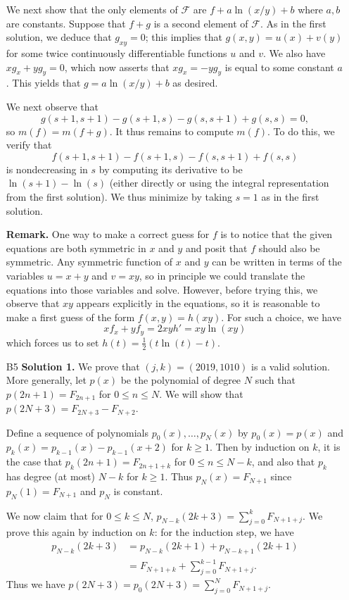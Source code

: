\documentclass[amssymb,twocolumn,pra,10pt,aps]{revtex4-1}
\begin{document}
\begin{itemize}
We next show that the only elements of $\mathcal{F}$ are $f+a \ln(x/y) + b$ where $a,b$ are constants.
Suppose that $f+g$ is a second element of $\mathcal{F}$. As in the first solution, we deduce that $g_{xy} = 0$; this implies that
$g(x,y) = u(x) + v(y)$ for some twice continuously differentiable functions $u$ and $v$. We also have
$xg_x + yg_y = 0$, which now asserts that $xg_x = - yg_y$ is equal to some constant $a$. This yields that
$g = a \ln(x/y) + b$ as desired.

We next observe that 
\[
g(s+1,s+1)-g(s+1,s)-g(s,s+1)+g(s,s) = 0,
\]
so $m(f) = m(f+g)$. It thus remains to compute $m(f)$. To do this, we verify that
\[
f(s+1,s+1)-f(s+1,s)-f(s,s+1)+f(s,s)
\]
is nondecreasing in $s$ by computing its derivative to be $\ln (s+1) - \ln(s)$
(either directly or using the integral representation from the first solution).
We thus minimize by taking $s=1$ as in the first solution.

\noindent
\textbf{Remark.}
One way to make a correct guess for $f$ is to notice that the given equations are both symmetric in $x$ and $y$
and posit that $f$ should also be symmetric. Any symmetric function of $x$ and $y$ can be written in terms of the variables $u = x+y$ and $v = xy$, so in principle we could translate the equations into those variables and solve. However, before trying this, we observe that $xy$ appears explicitly in the equations, so it is reasonable to make a first guess of the form $f(x,y) = h(xy)$. 
For such a choice, we have
\[
x f_x + y f_y = 2xy h' = xy \ln(xy)
\]
which forces us to set $h(t)  = \frac{1}{2}(t \ln(t) - t)$.

\item[B5]
\noindent
\textbf{Solution 1.}
We prove that $(j,k) = (2019, 1010)$ is a valid solution.
More generally, let $p(x)$ be the polynomial of degree $N$ such that $p(2n+1) = F_{2n+1}$ for $0 \leq n \leq N$. We will show that $p(2N+3) = F_{2N+3}-F_{N+2}$. 

Define a sequence of polynomials $p_0(x),\ldots,p_N(x)$ by $p_0(x) = p(x)$ and $p_k(x) = p_{k-1}(x)-p_{k-1}(x+2)$ for $k \geq 1$. Then by induction on $k$, it is the case that $p_k(2n+1) = F_{2n+1+k}$ for $0 \leq n \leq N-k$, and also that $p_k$ has degree (at most) $N-k$ for $k \geq 1$. Thus $p_N(x) = F_{N+1}$ since $p_N(1) = F_{N+1}$ and $p_N$ is constant.


We now claim that for $0\leq k\leq N$, $p_{N-k}(2k+3) = \sum_{j=0}^k F_{N+1+j}$. We prove this again by induction on $k$: for the induction step, we have
\begin{align*}
p_{N-k}(2k+3) &= p_{N-k}(2k+1)+p_{N-k+1}(2k+1) \\
&= F_{N+1+k}+\sum_{j=0}^{k-1} F_{N+1+j}.
\end{align*}
Thus we have $p(2N+3) = p_0(2N+3) = \sum_{j=0}^N F_{N+1+j}$. 


\end{itemize}
\end{document}
